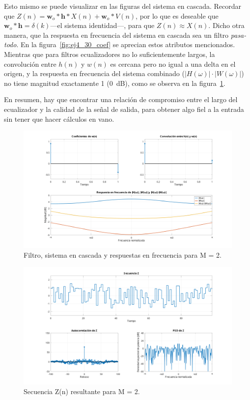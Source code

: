 Esto mismo se puede visualizar en las figuras del sistema en cascada. Recordar que $Z(n) = \mathbf{w}_o * \mathbf{h} * X(n) + \mathbf{w}_o * V(n)$, por lo que es deseable que $\mathbf{w}_o * \mathbf{h} = \delta(k)$---el sistema identidad---, para que $Z(n) \approx X(n)$. Dicho otra manera, que la respuesta en frecuencia del sistema en cascada sea un filtro \emph{pasa-todo}. En la figura~\ref{fig:ej4_30_coef} se aprecian estos atributos mencionados. Mientras que para filtros ecualizadores no lo suficientemente largos, la convolución entre $h(n)$ y $w(n)$ es cercana pero no igual a una delta en el origen, y la respuesta en frecuencia del sistema combinado ($|H(\omega)| \cdot |W(\omega)|$) no tiene magnitud exactamente 1 (\qty{0}{\dB}), como se observa en la figura~\ref{fig:ej4_2_coef}.

En resumen, hay que encontrar una relación de compromiso entre el largo del ecualizador y la calidad de la señal de salida, para obtener algo fiel a la entrada sin tener que hacer cálculos en vano.

\begin{figure}[!hbp]
	\centering
	\includegraphics[width=1\linewidth,trim=4cm 0 4cm 0,clip]{img/ej4_2_coef.pdf}
	\caption{Filtro, sistema en cascada y respuestas en frecuencia para M = 2.}
	\label{fig:ej4_2_coef}
\end{figure}

\begin{figure}[!hbp]
	\centering
	\includegraphics[width=1\linewidth,trim=4cm 0 4cm 0,clip]{img/ej4_2_z.pdf}
	\caption{Secuencia Z(n) resultante para M = 2.}
	\label{fig:ej4_2_z}
\end{figure}

